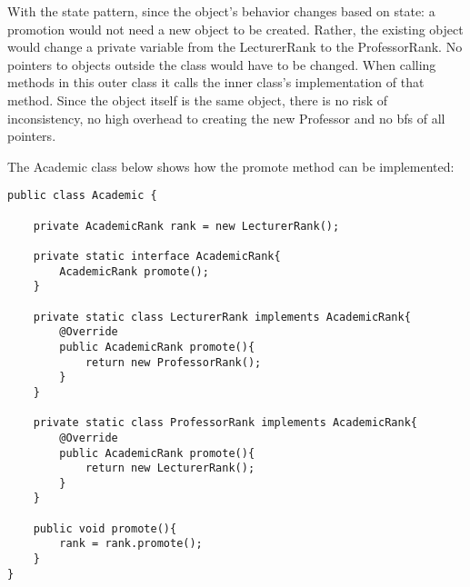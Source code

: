 \documentclass[10pt,\jkfside,a4paper]{article}
\begin{document}
With the state pattern, since the object's behavior changes based on state: a promotion would not need a new 
object to be created. Rather, the existing object would change a private variable from the LecturerRank to the 
ProfessorRank. No pointers to objects outside the class would have to be changed. When calling methods in this 
outer class it calls the inner class's implementation of that method. Since the object itself is the same object, 
there is no risk of inconsistency, no high overhead to creating the new Professor and no bfs of all pointers.

The Academic class below shows how the promote method can be implemented:

\begin{lstlisting}
public class Academic {

    private AcademicRank rank = new LecturerRank();
	
    private static interface AcademicRank{
        AcademicRank promote();
    }

    private static class LecturerRank implements AcademicRank{
        @Override
        public AcademicRank promote(){
            return new ProfessorRank();
        }
    }

    private static class ProfessorRank implements AcademicRank{
        @Override
        public AcademicRank promote(){
            return new LecturerRank();
        }
    }

    public void promote(){
        rank = rank.promote();
    }
}
\end{lstlisting}
\end{document}
